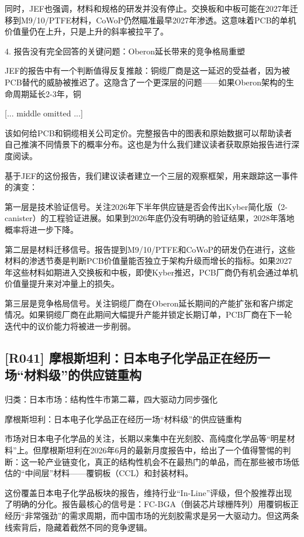 \documentclass[11pt]{ctexart}
\begin{document}
同时，JEF也强调，材料和规格的研发并没有停止。交换板和中板可能在2027年迁移到M9/10/PTFE材料，CoWoP仍然瞄准最早2027年渗透。这意味着PCB的单机价值量仍在上升，只是上升的斜率被拉平了。

4. 报告没有完全回答的关键问题：Oberon延长带来的竞争格局重塑

JEF的报告中有一个判断值得反复推敲：铜缆厂商是这一延迟的受益者，因为被PCB替代的威胁被推迟了。这隐含了一个更深层的问题——如果Oberon架构的生命周期延长2-3年，铜

[... middle omitted ...]

该如何给PCB和铜缆相关公司定价。完整报告中的图表和原始数据可以帮助读者自己推演不同情景下的概率分布。这也是为什么我们建议读者获取原始报告进行深度阅读。

基于JEF的这份报告，我们建议读者建立一个三层的观察框架，用来跟踪这一事件的演变：

第一层是技术验证信号。关注2026年下半年供应链是否会传出Kyber简化版（2-canister）的工程验证进展。如果到2026年底仍没有明确的验证结果，2028年落地概率将进一步下降。

第二层是材料迁移信号。报告提到M9/10/PTFE和CoWoP的研发仍在进行，这些材料的渗透节奏是判断PCB价值量能否独立于架构升级而增长的指标。如果2027年这些材料如期进入交换板和中板，即使Kyber推迟，PCB厂商仍有机会通过单机价值量提升来对冲量上的损失。

第三层是竞争格局信号。关注铜缆厂商在Oberon延长期间的产能扩张和客户绑定情况。如果铜缆厂商在此期间大幅提升产能并锁定长期订单，PCB厂商在下一轮迭代中的议价能力将被进一步削弱。

\subsection{[R041] 摩根斯坦利：日本电子化学品正在经历一场“材料级”的供应链重构}
{\small\color{refgray}归类：日本市场：结构性牛市第二幕，四大驱动力同步强化}

摩根斯坦利：日本电子化学品正在经历一场“材料级”的供应链重构

市场对日本电子化学品的关注，长期以来集中在光刻胶、高纯度化学品等“明星材料”上。但摩根斯坦利在2026年6月的最新月度报告中，给出了一个值得警惕的判断：这一轮产业链变化，真正的结构性机会不在最热门的单品，而在那些被市场低估的“中间层”材料——覆铜板（CCL）和封装材料。

这份覆盖日本电子化学品板块的报告，维持行业“In-Line”评级，但个股推荐出现了明确的分化。报告最核心的信号是：FC-BGA（倒装芯片球栅阵列）用覆铜板正经历“非常强劲”的需求周期，而中国市场的光刻胶需求是另一大驱动力。但这两条线索背后，隐藏着截然不同的竞争逻辑。
\end{document}
